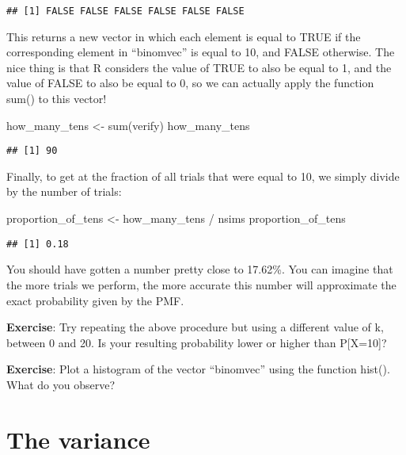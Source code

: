 \documentclass[
]{book}
\newenvironment{Shaded}{\begin{snugshade}}{\end{snugshade}}
\newcommand{\FunctionTok}[1]{\textcolor[rgb]{0.00,0.00,0.00}{#1}}
\newcommand{\NormalTok}[1]{#1}
\newcommand{\OtherTok}[1]{\textcolor[rgb]{0.56,0.35,0.01}{#1}}
\newcommand{\SpecialCharTok}[1]{\textcolor[rgb]{0.00,0.00,0.00}{#1}}
\begin{document}
\begin{verbatim}
## [1] FALSE FALSE FALSE FALSE FALSE FALSE
\end{verbatim}

This returns a new vector in which each element is equal to TRUE if the corresponding element in ``binomvec'' is equal to 10, and FALSE otherwise. The nice thing is that R considers the value of TRUE to also be equal to 1, and the value of FALSE to also be equal to 0, so we can actually apply the function sum() to this vector!

\begin{Shaded}
\begin{Highlighting}[]
\NormalTok{how\_many\_tens }\OtherTok{\textless{}{-}} \FunctionTok{sum}\NormalTok{(verify)}
\NormalTok{how\_many\_tens}
\end{Highlighting}
\end{Shaded}

\begin{verbatim}
## [1] 90
\end{verbatim}

Finally, to get at the fraction of all trials that were equal to 10, we simply divide by the number of trials:

\begin{Shaded}
\begin{Highlighting}[]
\NormalTok{proportion\_of\_tens }\OtherTok{\textless{}{-}}\NormalTok{ how\_many\_tens }\SpecialCharTok{/}\NormalTok{ nsims}
\NormalTok{proportion\_of\_tens}
\end{Highlighting}
\end{Shaded}

\begin{verbatim}
## [1] 0.18
\end{verbatim}

You should have gotten a number pretty close to 17.62\%. You can imagine that the more trials we perform, the more accurate this number will approximate the exact probability given by the PMF.

\textbf{Exercise}: Try repeating the above procedure but using a different value of k, between 0 and 20. Is your resulting probability lower or higher than P{[}X=10{]}?

\textbf{Exercise}: Plot a histogram of the vector ``binomvec'' using the function hist(). What do you observe?

\hypertarget{the-variance}{%
\section{The variance}\label{the-variance}}
\end{document}
